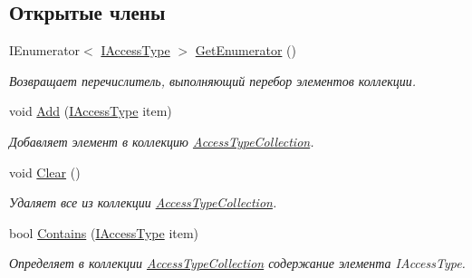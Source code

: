 \subsection*{Открытые члены}
\begin{DoxyCompactItemize}
\item 
I\+Enumerator$<$ \hyperlink{interface_security_1_1_interfaces_1_1_model_1_1_i_access_type}{I\+Access\+Type} $>$ \hyperlink{class_security_1_1_entity_framework_1_1_collections_1_1_access_type_collection_adb954d417bd124bddc20d4ec9f89213d}{Get\+Enumerator} ()
\begin{DoxyCompactList}\small\item\em Возвращает перечислитель, выполняющий перебор элементов коллекции. \end{DoxyCompactList}\item 
void \hyperlink{class_security_1_1_entity_framework_1_1_collections_1_1_access_type_collection_ae946bd67950f839deab2a0fc5a0d0c75}{Add} (\hyperlink{interface_security_1_1_interfaces_1_1_model_1_1_i_access_type}{I\+Access\+Type} item)
\begin{DoxyCompactList}\small\item\em Добавляет элемент в коллекцию \hyperlink{class_security_1_1_entity_framework_1_1_collections_1_1_access_type_collection}{Access\+Type\+Collection}. \end{DoxyCompactList}\item 
void \hyperlink{class_security_1_1_entity_framework_1_1_collections_1_1_access_type_collection_a841edd57caa386ff09a6f861d57d539a}{Clear} ()
\begin{DoxyCompactList}\small\item\em Удаляет все из коллекции \hyperlink{class_security_1_1_entity_framework_1_1_collections_1_1_access_type_collection}{Access\+Type\+Collection}. \end{DoxyCompactList}\item 
bool \hyperlink{class_security_1_1_entity_framework_1_1_collections_1_1_access_type_collection_a759dff7eef80475a7649cc0ef25a7532}{Contains} (\hyperlink{interface_security_1_1_interfaces_1_1_model_1_1_i_access_type}{I\+Access\+Type} item)
\begin{DoxyCompactList}\small\item\em Определяет в коллекции \hyperlink{class_security_1_1_entity_framework_1_1_collections_1_1_access_type_collection}{Access\+Type\+Collection} содержание элемента I\+Access\+Type. \end{DoxyCompactList}\item 

\end{DoxyCompactItemize}
